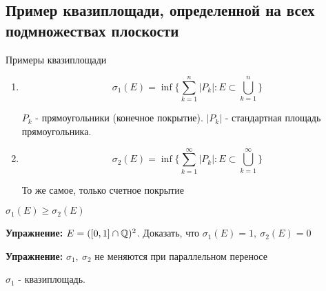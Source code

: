 \subsection{Пример квазиплощади, определенной на всех подмножествах плоскости \href{https://youtu.be/p9C57KDo1Yg?t=7344}{\Walley}}

Примеры квазиплощади

\begin{enumerate}
    \item \[\sigma_1(E) = \inf \bigg\{ \sum_{k=1}^{n}|P_k| : E \subset \bigcup\limits_{k=1}^n \bigg\} \]

$P_k$ - прямоугольники (конечное покрытие). $|P_k|$ - стандартная площадь прямоугольника.
    \item \[\sigma_2(E) = \inf \bigg\{ \sum_{k=1}^{\infty}|P_k| : E \subset \bigcup\limits_{k=1}^{\infty} \bigg\} \]

То же самое, только счетное покрытие
\end{enumerate}

\notice \; $\sigma_1(E) \geqslant \sigma_2(E)$

\textbf{Упражнение:} $E = ([0, 1] \cap \mathbb{Q})^2$. Доказать, что $\sigma_1(E) = 1,\ \sigma_2(E) = 0$

\textbf{Упражнение:} $\sigma_1,\ \sigma_2$ не меняются при параллельном переносе

\begin{theorem-non}
    $\sigma_1$ - квазиплощадь.
\end{theorem-non}

